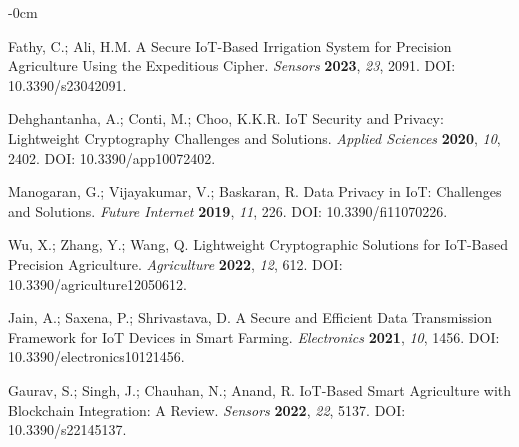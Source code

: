 \documentclass[journal]{Definitions/mdpi}
\begin{document}
\begin{adjustwidth}{-\extralength}{0cm}



%

\begin{thebibliography}{999}
Fathy, C.; Ali, H.M. A Secure IoT-Based Irrigation System for Precision Agriculture Using the Expeditious Cipher. {\em Sensors} {\bf 2023}, {\em 23}, 2091. DOI: 10.3390/s23042091.

Dehghantanha, A.; Conti, M.; Choo, K.K.R. IoT Security and Privacy: Lightweight Cryptography Challenges and Solutions. {\em Applied Sciences} {\bf 2020}, {\em 10}, 2402. DOI: 10.3390/app10072402.

Manogaran, G.; Vijayakumar, V.; Baskaran, R. Data Privacy in IoT: Challenges and Solutions. {\em Future Internet} {\bf 2019}, {\em 11}, 226. DOI: 10.3390/fi11070226.

Wu, X.; Zhang, Y.; Wang, Q. Lightweight Cryptographic Solutions for IoT-Based Precision Agriculture. {\em Agriculture} {\bf 2022}, {\em 12}, 612. DOI: 10.3390/agriculture12050612.

Jain, A.; Saxena, P.; Shrivastava, D. A Secure and Efficient Data Transmission Framework for IoT Devices in Smart Farming. {\em Electronics} {\bf 2021}, {\em 10}, 1456. DOI: 10.3390/electronics10121456.

Gaurav, S.; Singh, J.; Chauhan, N.; Anand, R. IoT-Based Smart Agriculture with Blockchain Integration: A Review. {\em Sensors} {\bf 2022}, {\em 22}, 5137. DOI: 10.3390/s22145137.


\end{thebibliography}
\end{adjustwidth}
\end{document}
